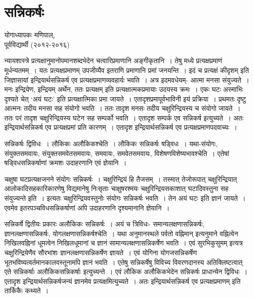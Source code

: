 {\fontsize{15}{17}\selectfont
\chapter{सन्निकर्षः}

\begin{center}
\smallskip

योगाध्यापकः मणिपाल्,\\
पूर्वविद्यार्थी (२०१२-२०१६)
\addrule
\end{center} 
न्यायशास्त्रे प्रत्यक्षानुमानोपमानशब्दभेदेन चत्वारिप्रमाणानि अङ्गीकृतानि~। तेषु मध्ये प्रत्यक्षप्रमाणं मूर्धन्यतमम्~। यतः प्रत्यक्षप्रमाणम् उपजीव्यैव इतराणि प्रमाणानि प्रमां जनयन्ति~। इदं च प्रत्यक्षं कीदृशम् इति जिज्ञासायां इन्द्रियार्थसन्निकर्ष एव प्रत्यक्षप्रमाणव्यवहार्यः भवति~। अत्र इदमवधेयम्- आत्मा मनसा संयुज्यते~। मनः इन्द्रियेण, इन्द्रियम् अर्थेन, ततः प्रत्यक्षम् इति प्रत्यक्षात्मकप्रमायाः उदयस्य क्रमः~। एकः घटः अस्माभिः दृश्यते चेत् ‘अयं घटः’ इति प्रत्यक्षात्मिका प्रमा जायते~। एतादृशप्रमापूर्वभाविनी इयं प्रक्रिया~। प्रथमतः दृष्टु आत्मनः तदीय मनसा सह संयोगो भवति~। ततः तादृश मनसः तदीय चक्षुरिन्द्रियस्य च संयोगो जायते~। ततः परं तादृश चक्षुरिन्द्रियस्य घटेन सह सम्पर्को भवति~। एतादृश सम्पर्क एव सन्निकर्ष इत्युच्यते~। अतः इन्द्रियार्थसन्निकर्ष एव प्रत्यक्षप्रमां प्रति कारणम्~। एतादृश इन्द्रियार्थसन्निकर्ष एव प्रत्यक्षप्रमाणपदवाच्यः~। 

सन्निकर्षः द्विविधः~। लौकिकः अलौकिकश्चेति~। लौकिकः सन्निकर्षः षड्विधः~। यथा-संयोगः, संयुक्तसमवायः, संयुक्तसमवेतसमवायः, समवायः, समवेतसमवायः, विशेषणविशेष्यभावश्चेति~। एतेषां षड्विधसन्निकर्षाणां क्रमशः उदाहरणानि एवं ज्ञेयानि~। 

चक्षुषा घटप्रत्यक्षजनने संयोगः सन्निकर्षः~। चक्षुरिन्द्रियं हि तैजसम्~। तस्मात् तेजोरूपात् चक्षुरिन्द्रियात् आलोकादिसहकारिकारणेषु विद्यमानेषु निःसृताः चाक्षुषरश्मयः चक्षुरिन्द्रियसकाशात् घटादिवस्तुना सह संयुज्यन्ते इति~। इत्यतः चक्षुरिन्द्रियवस्तुनोः संयोगः सन्निकर्षः भवति~। तेन अयं घटः इति ज्ञानं जायते~। एवमेव इतरपञ्चविधसन्निकर्षाणां अपि उदाहरणानि दृश्यमानानि ज्ञेयानि~।            

सन्निकर्षे द्वितीयः प्रकारः अलौकिकः सन्निकर्षः~। अयं च त्रिविधः- समान्यलक्षणासन्निकर्षः, ज्ञानलक्षणासन्निकर्षः, योगलक्षणासन्निकर्षश्चेति~। यथा अनुमानस्थले पर्वतो वह्निमान् इत्यनुमाने वह्नित्वेन निखिलवह्निनां धूमत्वेन निखिलधूमानां च ज्ञानं सामान्यलक्षणासन्निकर्षेण भवति~। एवं सुरभिकुसुमम् इत्यत्र चक्षुरिन्द्रियेणैव सौरभांशः ज्ञानलक्षणासन्निकर्षेण ज्ञायते~। एवं योगिना योगजसन्निकर्षेण भूतभविष्यत्वर्तमानकालवस्तूनामपि ज्ञानं भवति~। एतेषु सन्निकर्षेषु विविच्य विवरणदानस्य अतिक्लिष्टत्वात् एते सन्निकर्षाः अलौकिकसन्निकर्षाः इत्युच्यन्ते~। एवं लौकिक अलौकिकभेदेन सन्निकर्षः प्राधान्येन द्विविधः~। एतादृश इन्द्रियार्थसन्निकर्षजन्यं ज्ञानमेव प्रत्यक्षमित्युच्यते~। अतः  इन्द्रियार्थसन्निकर्ष एव प्रत्यक्षप्रमाणम् इति तार्किकैः कथ्यते~। 

\articleend
}
